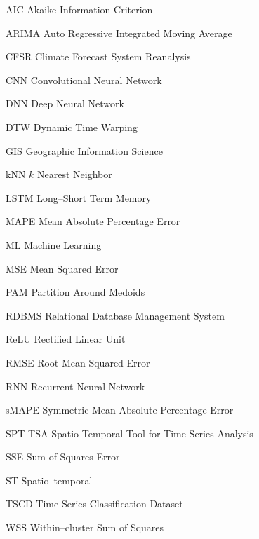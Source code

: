 \documentclass[
	final,				%
	12pt,				%
	openright,			%
	oneside,			%
	a4paper,			%
	hyphens,            %
	sumario=tradicional,%
	english,			%
	french,				%
	spanish,			%
	brazil				%
	]{abntex2}
\begin{document}
\begin{siglas}
  \item[AIC] Akaike Information Criterion
  \item[ARIMA] Auto Regressive Integrated Moving Average
  \item[CFSR] Climate Forecast System Reanalysis
  \item[CNN] Convolutional Neural Network
  \item[DNN] Deep Neural Network
  \item[DTW] Dynamic Time Warping
  \item[GIS] Geographic Information Science  
  \item[kNN] $k$ Nearest Neighbor
  \item[LSTM] Long--Short Term Memory
  \item[MAPE] Mean Absolute Percentage Error
  \item[ML] Machine Learning
  \item[MSE] Mean Squared Error
  \item[PAM] Partition Around Medoids
  \item[RDBMS] Relational Database Management System
  \item[ReLU] Rectified Linear Unit
  \item[RMSE] Root Mean Squared Error
  \item[RNN] Recurrent Neural Network
  \item[sMAPE] Symmetric Mean Absolute Percentage Error
  \item[SPT-TSA] Spatio-Temporal Tool for Time Series Analysis
  \item[SSE] Sum of Squares Error
  \item[ST] Spatio--temporal
  \item[TSCD] Time Series Classification Dataset
  \item[WSS] Within--cluster Sum of Squares
\end{siglas}


\tableofcontents*
\cleardoublepage
\end{document}
